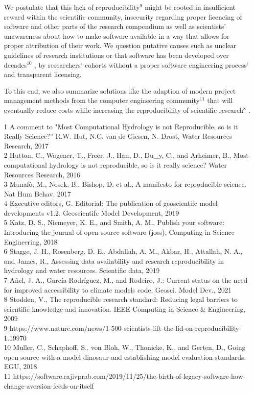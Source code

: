 \documentclass{article}
\begin{document}
We postulate that this lack of reproducibility$^{9}$  might be rooted in insufficient reward within the scientific community, insecurity regarding proper licencing of software and other parts of the research compendium as well as scientists’ unawareness about how to make software available in a way that allows for proper attribution of their work.
We question putative causes such as unclear guidelines of research institutions or that software has been developed over decades$^{10}$ , by researchers' cohorts without a proper software engineering process¹ and transparent licensing.

To this end, we also summarize solutions like the adaption of modern project management methods from the computer engineering community$^{11}$  that will eventually reduce costs while increasing the reproducibility of scientific research$^{8}$ .

1 A comment to "Most Computational Hydrology is not Reproducible, so is it Really Science?” R.W. Hut, N.C. van de Giesen, N. Drost, Water Resources Research, 2017\\
2 Hutton, C., Wagener, T., Freer, J., Han, D., Du\_y, C., and Arheimer, B., Most computational hydrology is not reproducible, so is it really science? Water Resources Research, 2016\\
3 Munafò, M., Nosek, B., Bishop, D. et al., A manifesto for reproducible science. Nat Hum Behav, 2017\\
4 Executive editors, G. Editorial: The publication of geoscientifc model developments v1.2. Geoscientifc Model Development, 2019\\
5 Katz, D. S., Niemeyer, K. E., and Smith, A. M., Publish your software: Introducing the journal of open source software (joss), Computing in Science Engineering, 2018\\
6 Stagge, J. H., Rosenberg, D. E., Abdallah, A. M., Akbar, H., Attallah, N. A., and James, R., Assessing data availability and research reproducibility in hydrology and water resources. Scientific data, 2019\\
7 Añel, J. A., García-Rodríguez, M., and Rodeiro, J.: Current status on the need for improved accessibility to climate models code, Geosci. Model Dev., 2021\\
8 Stodden, V., The reproducible research standard: Reducing legal barriers to scientific knowledge and innovation. IEEE Computing in Science \& Engineering, 2009\\
9 https://www.nature.com/news/1-500-scientists-lift-the-lid-on-reproducibility-1.19970\\
10 Muller, C., Schaphoff, S., von Bloh, W., Thonicke, K., and Gerten, D., Going open-source with a model dinosaur and establishing model evaluation standards. EGU, 2018\\
11 https://software.rajivprab.com/2019/11/25/the-birth-of-legacy-software-how-change-aversion-feeds-on-itself\\
\end{document}
